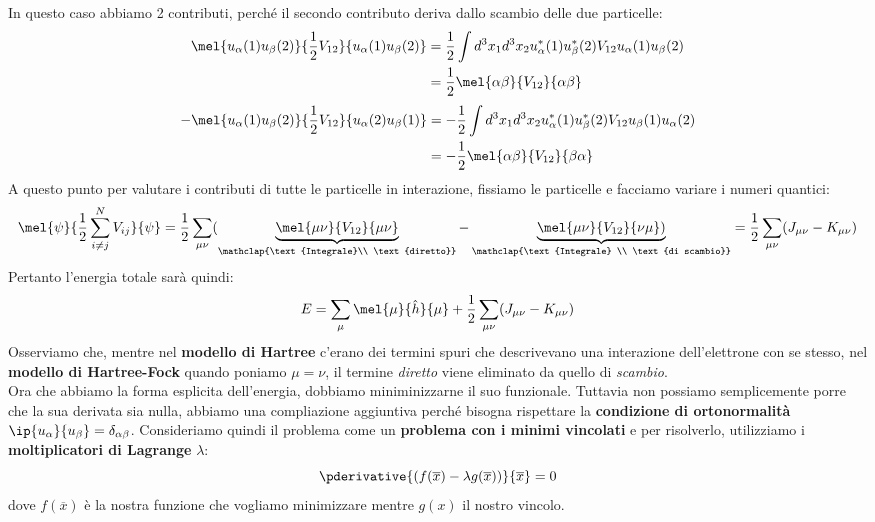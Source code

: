In questo caso abbiamo 2 contributi, perché il secondo contributo deriva dallo scambio delle due particelle:
\begin{equation*}
    \begin{aligned}
    \mel{u_\alpha(1)u_\beta(2)}{\frac 12 V_{12}}{u_\alpha(1)u_\beta(2)}
    & = \frac 12 \int d^3x_1d^3x_2u_\alpha^*(1)u_\beta^*(2)V_{12}u_\alpha(1)u_\beta(2) \\
    & = \frac 12 \mel{\alpha\beta}{V_{12}}{\alpha\beta}
    \end{aligned}
\end{equation*}
\begin{equation*}
    \begin{aligned}
    -\mel{u_\alpha(1)u_\beta(2)}{\frac 12 V_{12}}{u_\alpha(2)u_\beta(1)}
    & = - \frac 12 \int d^3x_1d^3x_2u_\alpha^*(1)u_\beta^*(2)V_{12}u_\beta(1)u_\alpha(2) \\
    & = - \frac 12 \mel{\alpha\beta}{V_{12}}{\beta\alpha}
    \end{aligned}
\end{equation*}
A questo punto per valutare i contributi di tutte le particelle in interazione, fissiamo le particelle e facciamo variare i numeri quantici:
\begin{equation*}
    \mel{\psi}{\frac 12 \sum_{i\neq j}^NV_{ij}}{\psi}=\frac 12 \sum_{\mu\nu}(\underbrace{\mel{\mu\nu}{V_{12}}{\mu\nu}}_{\mathclap{\text{Integrale}\\ \text{diretto}}}-\underbrace{\mel{\mu\nu}{V_{12}}{\nu\mu})}_{\mathclap{\text{Integrale} \\ \text{di scambio}}}=\frac 12 \sum_{\mu\nu}(J_{\mu\nu}-K_{\mu\nu})
\end{equation*}
Pertanto l'energia totale sarà quindi:
\begin{equation*}
    E=\sum_\mu\mel{\mu}{\hat h}{\mu}+\frac 12\sum_{\mu\nu}(J_{\mu\nu}-K_{\mu\nu})
\end{equation*}
Osserviamo che, mentre nel \textbf{modello di Hartree} c'erano dei termini spuri che descrivevano una interazione dell'elettrone con se stesso, nel \textbf{modello di Hartree-Fock} quando poniamo $\mu=\nu$, il termine \textit{diretto} viene eliminato da quello di \textit{scambio}.\\
Ora che abbiamo la forma esplicita dell'energia, dobbiamo miniminizzarne il suo funzionale. Tuttavia non possiamo semplicemente porre che la sua derivata sia nulla, abbiamo una compliazione aggiuntiva perché bisogna rispettare la \textbf{condizione di ortonormalità} $\ip{u_\alpha}{u_\beta}=\delta_{\alpha\beta}$. Consideriamo quindi il problema come un \textbf{problema con i minimi vincolati} e per risolverlo, utilizziamo i \textbf{moltiplicatori di Lagrange} $\lambda$:
\begin{equation*}
    \pderivative{(f(\overline x)-\lambda g(\overline x))}{\overline x}=0
\end{equation*}
dove $f(\overline x)$ è la nostra funzione che vogliamo minimizzare mentre $g(x)$ il nostro vincolo. \\


